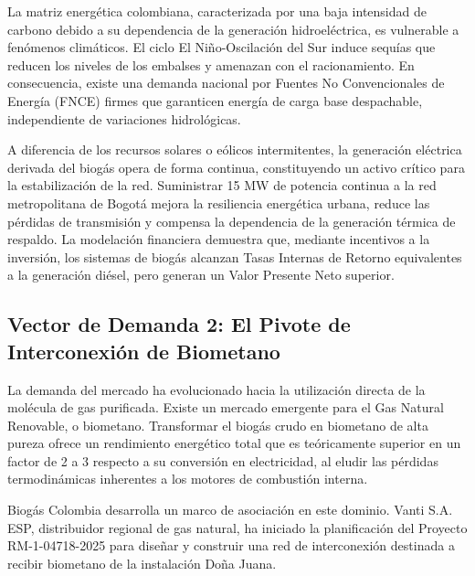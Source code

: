 \documentclass[11pt,letterpaper]{article}
\begin{document}
La matriz energética colombiana, caracterizada por una baja intensidad de
carbono debido a su dependencia de la generación hidroeléctrica, es vulnerable a
fenómenos climáticos. El ciclo El Niño-Oscilación del Sur induce sequías que
reducen los niveles de los embalses y amenazan con el racionamiento.  En
consecuencia, existe una demanda nacional por Fuentes No Convencionales de
Energía (FNCE) firmes que garanticen energía de carga base despachable,
independiente de variaciones hidrológicas.

A diferencia de los recursos solares o eólicos intermitentes, la generación
eléctrica derivada del biogás opera de forma continua, constituyendo un activo
crítico para la estabilización de la red.  Suministrar 15 MW de potencia
continua a la red metropolitana de Bogotá mejora la resiliencia energética
urbana, reduce las pérdidas de transmisión y compensa la dependencia de la
generación térmica de respaldo. La modelación financiera demuestra que, mediante
incentivos a la inversión, los sistemas de biogás alcanzan Tasas Internas de
Retorno equivalentes a la generación diésel, pero generan un Valor Presente Neto
superior.

\subsection{Vector de Demanda 2: El Pivote de Interconexión de Biometano}

La demanda del mercado ha evolucionado hacia la utilización directa de la
molécula de gas purificada. Existe un mercado emergente para el Gas Natural
Renovable, o biometano. Transformar el biogás crudo en biometano de alta pureza
ofrece un rendimiento energético total que es teóricamente superior en un factor
de 2 a 3 respecto a su conversión en electricidad, al eludir las pérdidas
termodinámicas inherentes a los motores de combustión interna.

Biogás Colombia desarrolla un marco de asociación en este dominio. Vanti S.A.
ESP, distribuidor regional de gas natural, ha iniciado la planificación del
Proyecto RM-1-04718-2025 para diseñar y construir una red de interconexión
destinada a recibir biometano de la instalación Doña Juana.
\end{document}

